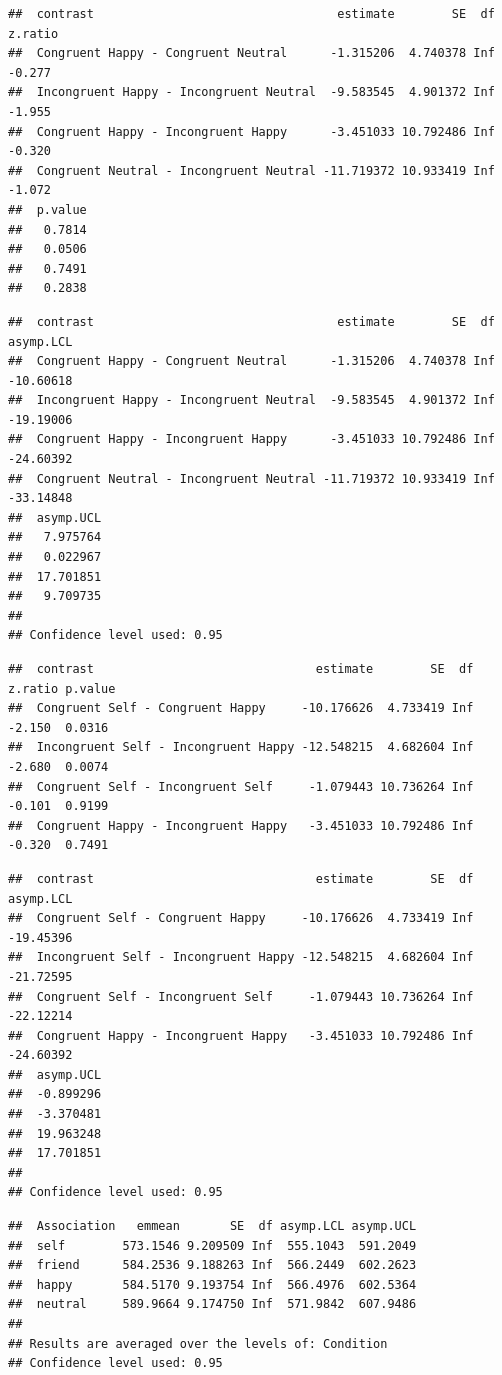 \documentclass[
  man]{apa6}
\begin{document}
\begin{verbatim}
##  contrast                                  estimate        SE  df z.ratio
##  Congruent Happy - Congruent Neutral      -1.315206  4.740378 Inf  -0.277
##  Incongruent Happy - Incongruent Neutral  -9.583545  4.901372 Inf  -1.955
##  Congruent Happy - Incongruent Happy      -3.451033 10.792486 Inf  -0.320
##  Congruent Neutral - Incongruent Neutral -11.719372 10.933419 Inf  -1.072
##  p.value
##   0.7814
##   0.0506
##   0.7491
##   0.2838
\end{verbatim}

\begin{verbatim}
##  contrast                                  estimate        SE  df asymp.LCL
##  Congruent Happy - Congruent Neutral      -1.315206  4.740378 Inf -10.60618
##  Incongruent Happy - Incongruent Neutral  -9.583545  4.901372 Inf -19.19006
##  Congruent Happy - Incongruent Happy      -3.451033 10.792486 Inf -24.60392
##  Congruent Neutral - Incongruent Neutral -11.719372 10.933419 Inf -33.14848
##  asymp.UCL
##   7.975764
##   0.022967
##  17.701851
##   9.709735
## 
## Confidence level used: 0.95
\end{verbatim}

\begin{verbatim}
##  contrast                               estimate        SE  df z.ratio p.value
##  Congruent Self - Congruent Happy     -10.176626  4.733419 Inf  -2.150  0.0316
##  Incongruent Self - Incongruent Happy -12.548215  4.682604 Inf  -2.680  0.0074
##  Congruent Self - Incongruent Self     -1.079443 10.736264 Inf  -0.101  0.9199
##  Congruent Happy - Incongruent Happy   -3.451033 10.792486 Inf  -0.320  0.7491
\end{verbatim}

\begin{verbatim}
##  contrast                               estimate        SE  df asymp.LCL
##  Congruent Self - Congruent Happy     -10.176626  4.733419 Inf -19.45396
##  Incongruent Self - Incongruent Happy -12.548215  4.682604 Inf -21.72595
##  Congruent Self - Incongruent Self     -1.079443 10.736264 Inf -22.12214
##  Congruent Happy - Incongruent Happy   -3.451033 10.792486 Inf -24.60392
##  asymp.UCL
##  -0.899296
##  -3.370481
##  19.963248
##  17.701851
## 
## Confidence level used: 0.95
\end{verbatim}

\begin{verbatim}
##  Association   emmean       SE  df asymp.LCL asymp.UCL
##  self        573.1546 9.209509 Inf  555.1043  591.2049
##  friend      584.2536 9.188263 Inf  566.2449  602.2623
##  happy       584.5170 9.193754 Inf  566.4976  602.5364
##  neutral     589.9664 9.174750 Inf  571.9842  607.9486
## 
## Results are averaged over the levels of: Condition 
## Confidence level used: 0.95
\end{verbatim}
\end{document}
